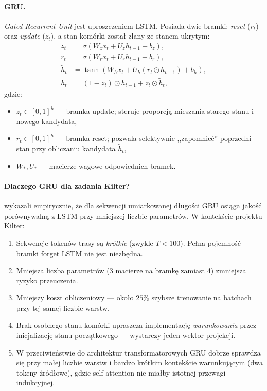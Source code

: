 \documentclass[12pt,a4paper]{article}
\begin{document}
\paragraph{GRU.}
\textit{Gated Recurrent Unit} \citep{cho2014gru} jest uproszczeniem LSTM. Posiada dwie bramki: \emph{reset} ($r_t$) oraz \emph{update} ($z_t$), a stan komórki został zlany ze stanem ukrytym:
\begin{equation}
\begin{aligned}
z_t &= \sigma(W_z x_t + U_z h_{t-1} + b_z), \\
r_t &= \sigma(W_r x_t + U_r h_{t-1} + b_r), \\
\tilde h_t &= \tanh\!\left(W_h x_t + U_h (r_t \odot h_{t-1}) + b_h \right), \\
h_t &= (1 - z_t) \odot h_{t-1} + z_t \odot \tilde h_t,
\end{aligned}
\end{equation}
gdzie:
\begin{itemize}[leftmargin=1.5em]
    \item $z_t \in [0,1]^h$ --- bramka update; steruje proporcją mieszania starego stanu i nowego kandydata,
    \item $r_t \in [0,1]^h$ --- bramka reset; pozwala selektywnie ,,zapomnieć'' poprzedni stan przy obliczaniu kandydata $\tilde h_t$,
    \item $W_*, U_*$ --- macierze wagowe odpowiednich bramek.
\end{itemize}

\paragraph{Dlaczego GRU dla zadania Kilter?}
\citet{chung2014empirical} wykazali empirycznie, że dla sekwencji umiarkowanej długości GRU osiąga jakość porównywalną z LSTM przy mniejszej liczbie parametrów. W kontekście projektu Kilter:
\begin{enumerate}[leftmargin=1.5em]
    \item Sekwencje tokenów trasy są \emph{krótkie} (zwykle $T < 100$). Pełna pojemność bramki forget LSTM nie jest niezbędna.
    \item Mniejsza liczba parametrów (3 macierze na bramkę zamiast 4) zmniejsza ryzyko przeuczenia.
    \item Mniejszy koszt obliczeniowy --- około $25\%$ szybsze trenowanie na batchach przy tej samej liczbie warstw.
    \item Brak osobnego stanu komórki upraszcza implementację \emph{warunkowania} przez inicjalizację stanu początkowego --- wystarczy jeden wektor projekcji.
    \item W przeciwieństwie do architektur transformatorowych GRU dobrze sprawdza się przy małej liczbie warstw i bardzo krótkim kontekście warunkującym (dwa tokeny źródłowe), gdzie self-attention nie miałby istotnej przewagi indukcyjnej.
\end{enumerate}
\end{document}
